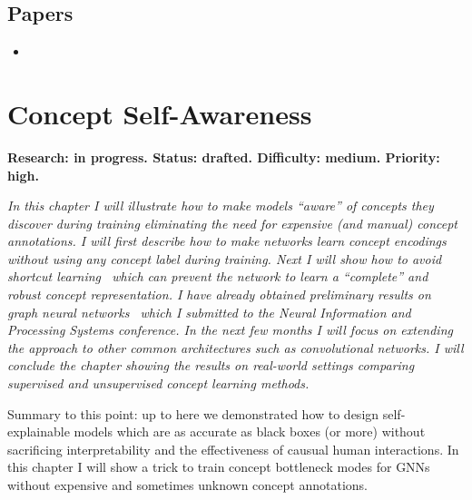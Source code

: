 \documentclass[withindex,glossary]{cam-thesis}
\theoremstyle{plain}
\theoremstyle{definition}
\theoremstyle{remark}
\begin{document}
\section*{Papers}
\nobibliography*
\begin{itemize}
    \item {}
\end{itemize}


\chapter{Concept Self-Awareness} \label{chapter:unsupervised}
\textbf{Research: in progress. Status: drafted. Difficulty: medium. Priority: high.}

\textit{In this chapter I will illustrate how to make models ``aware'' of concepts they discover during training eliminating the need for expensive (and manual) concept annotations. I will first describe how to make networks learn concept encodings without using any concept label during training. Next I will show how to avoid \textit{shortcut learning}~\citep{geirhos2020shortcut} which can prevent the network to learn a ``complete'' and robust concept representation. I have already obtained preliminary results on graph neural networks~\citep{magister2022encoding} which I submitted to the Neural Information and Processing Systems conference. In the next few months I will focus on extending the approach to other common architectures such as convolutional networks. I will conclude the chapter showing the results on real-world settings comparing supervised and unsupervised concept learning methods.}


Summary to this point: up to here we demonstrated how to design self-explainable models which are as accurate as black boxes (or more) without sacrificing interpretability and the effectiveness of causual human interactions. In this chapter I will show a trick to train concept bottleneck modes for GNNs without expensive and sometimes unknown concept annotations.
\end{document}
